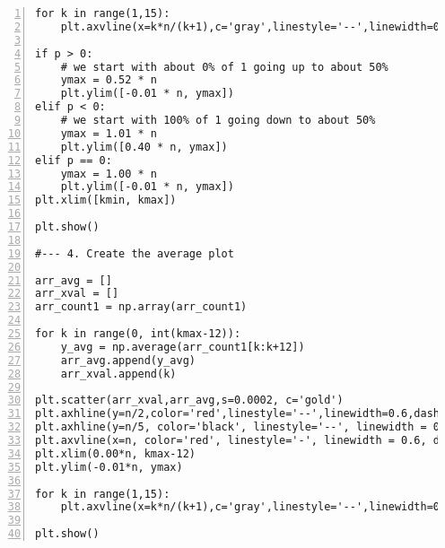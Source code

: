 \documentclass[10pt]{article}
\begin{document}
\begin{lstlisting}[numbers=left]
for k in range(1,15):
    plt.axvline(x=k*n/(k+1),c='gray',linestyle='--',linewidth=0.6,dashes=(5, 10))

if p > 0:
    # we start with about 0% of 1 going up to about 50%
    ymax = 0.52 * n
    plt.ylim([-0.01 * n, ymax]) 
elif p < 0:
    # we start with 100% of 1 going down to about 50%
    ymax = 1.01 * n
    plt.ylim([0.40 * n, ymax])
elif p == 0: 
    ymax = 1.00 * n
    plt.ylim([-0.01 * n, ymax])
plt.xlim([kmin, kmax])

plt.show()

#--- 4. Create the average plot

arr_avg = []
arr_xval = []
arr_count1 = np.array(arr_count1)

for k in range(0, int(kmax-12)):
    y_avg = np.average(arr_count1[k:k+12])
    arr_avg.append(y_avg)
    arr_xval.append(k)

plt.scatter(arr_xval,arr_avg,s=0.0002, c='gold')
plt.axhline(y=n/2,color='red',linestyle='--',linewidth=0.6,dashes=(5,10))   
plt.axhline(y=n/5, color='black', linestyle='--', linewidth = 0.6, dashes=(5, 10))
plt.axvline(x=n, color='red', linestyle='-', linewidth = 0.6, dashes=(5, 10))
plt.xlim(0.00*n, kmax-12)
plt.ylim(-0.01*n, ymax)

for k in range(1,15):
    plt.axvline(x=k*n/(k+1),c='gray',linestyle='--',linewidth=0.6,dashes=(5, 10))

plt.show()
\end{lstlisting}









\hypersetup{linkcolor=red} %
\hypersetup{linkcolor=red}
\end{document}
